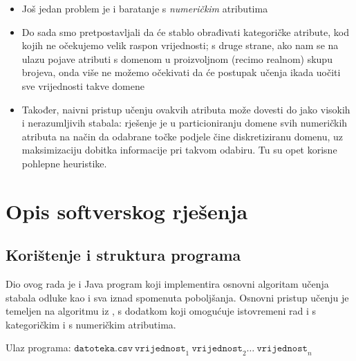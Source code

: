 \documentclass{beamer}
\begin{document}
\begin{frame}
    \begin{itemize}
        \item Još jedan problem je i baratanje s \emph{numeričkim} atributima
        \item Do sada smo pretpostavljali da će stablo obrađivati kategoričke atribute, kod kojih ne očekujemo
velik raspon vrijednosti; s druge strane, ako nam se na ulazu pojave atributi s domenom u proizvoljnom (recimo realnom) skupu brojeva,
onda više ne možemo očekivati da će postupak učenja ikada uočiti sve vrijednosti takve domene
\item Također, naivni pristup
učenju ovakvih atributa može dovesti do jako visokih i nerazumljivih stabala: rješenje je u particioniranju domene svih
numeričkih atributa na način da odabrane točke podjele čine diskretiziranu domenu, uz maksimizaciju dobitka informacije pri
takvom odabiru. Tu su opet korisne pohlepne heuristike.
    \end{itemize}
\end{frame}

\section{Opis softverskog rješenja}
\subsection{Korištenje i struktura programa}
\begin{frame}
Dio ovog rada je i Java program koji implementira osnovni algoritam učenja stabala odluke kao i sva iznad spomenuta poboljšanja.
Osnovni pristup učenju je temeljen na algoritmu iz \cite{rn}, s dodatkom koji omogućuje istovremeni rad i s kategoričkim i s
numeričkim atributima.

Ulaz programa: $\texttt{datoteka.csv}\ \texttt{vrijednost}_1\ \texttt{vrijednost}_2\ldots\ \texttt{vrijednost}_n$
\end{frame}
\end{document}
